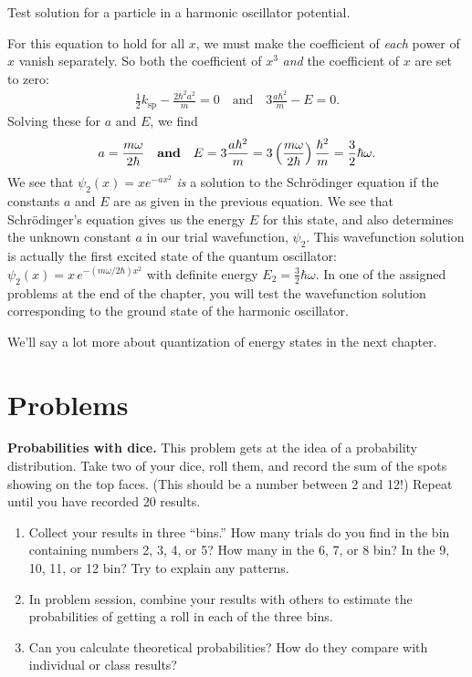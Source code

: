 \begin{example}{Test solution for a particle in a harmonic oscillator potential.}
\begin{solution}
For this equation to hold for all $x$, we must make the coefficient of 
\textit{each} power of $x$ vanish separately.  So both the coefficient 
of $x^3$ \textit{and} the coefficient of $x$ are set to zero:
\begin{align}
\frac{1}{2}k_\text{sp} - \frac{2\hbar^2a^2}{m} = 0 \quad \text{and} \quad 
3\frac{a\hbar^2}{m} - E = 0.
\end{align}
Solving these for $a$ and $E$, we find
\begin{equation}
a = \frac{m\omega}{2\hbar} \quad 
\mbox{\bf and} \quad E = 3\frac{a\hbar^2}{m}
   = 3\left(\frac{m\omega}{2\hbar}\right)\frac{\hbar^2}{m} 
   = \frac{3}{2}\hbar\omega .
\end{equation}
We see that $\psi_2(x) = x e^{-ax^2}$ \textit{is} a solution to the
Schr\"odinger equation if the constants $a$ and $E$ are as given in
the previous equation.  We see that Schr\"odinger's equation gives
us the energy $E$ for this state, and also determines the unknown
constant $a$ in our trial wavefunction, $\psi_2$.  This wavefunction
solution is actually the first excited state of the quantum oscillator:
$\psi_2(x) = x\,e^{-(m\omega/2\hbar)x^2}$ with definite energy $E_2 =
\frac{3}{2}\hbar\omega$.  In one of the assigned problems at the end of
the chapter, you will test the wavefunction solution corresponding to
the ground state of the harmonic oscillator.
\end{solution}
\end{example}

We'll say a lot more about quantization of energy states in the next chapter.

\newpage

\section*{Problems}
\label{sec:uncertainty_problems}



\begin{problem} 
 {\bf Probabilities with dice.} This problem gets at the idea of a
 probability distribution. Take two of your dice, roll them, and
 record the sum of the spots showing on the top faces.  (This should
 be a number between 2 and 12!)  Repeat until you have recorded 20
 results.
   \begin{enumerate}
   \item  Collect your results in three ``bins.''  How many trials do
   you find in the bin containing numbers 2, 3, 4, or 5? How many in
   the 6, 7, or 8 bin?  In the 9, 10, 11, or 12 bin?  Try to explain any
   patterns.
   \item  In problem session, combine your results with others to
   estimate the  probabilities of getting a roll in each of the three
   bins.
   \item Can you calculate theoretical probabilities?  How do they
    compare with individual or class results?
   \end{enumerate}
\label{prob:dice}
\end{problem}

